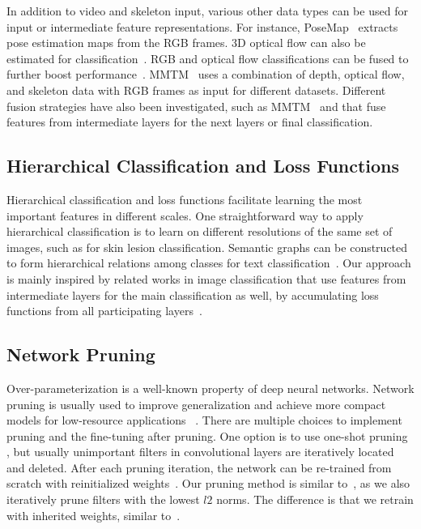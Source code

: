 \documentclass{article}
\begin{document}
{In addition to video and skeleton input, various other data types can be used for input or intermediate feature representations. For instance,  PoseMap~\cite{Liu2018Recognizing} extracts pose estimation maps from the RGB frames. 3D optical flow can also be estimated for classification~\cite{Ballin_3DFlowEstimation}. RGB and optical flow classifications can be fused to further boost performance~\cite{Simonyan_two-stream}. MMTM~\cite{joze2019mmtm} uses a combination of depth, optical flow, and skeleton data with RGB frames as input for different datasets. Different fusion strategies have also been investigated, such as MMTM~\cite{joze2019mmtm} and \cite{Perez_Rua_2019} that fuse features from intermediate layers for the next layers or final classification.}









\subsection{Hierarchical Classification and Loss Functions}
{Hierarchical classification and loss functions facilitate learning the most important features in different scales. One straightforward way to apply hierarchical classification is to learn on different resolutions of the same set of images, such as \cite{Kawahara2016MultiresolutionTractCW} for skin lesion classification. Semantic graphs can be constructed to form hierarchical relations among classes for text classification~\cite{Wu_2019}. Our approach is mainly inspired by related works in image classification that use features from intermediate layers for the main classification as well, by accumulating loss functions from all participating layers~\cite{Szegedy_2015_CVPR,huang2018multiscale}.}

\subsection{Network Pruning}
{Over-parameterization is a well-known property of deep neural networks. Network pruning is usually used to improve generalization and achieve more compact models for low-resource applications ~\cite{frankle2018lottery,liu2018rethinking}. There are multiple choices to implement pruning and the fine-tuning after pruning. One option is to use one-shot pruning \cite{li2016pruning}, but usually unimportant filters in convolutional layers are iteratively located and deleted. After each pruning iteration, the network can be re-trained from scratch with reinitialized weights~\cite{frankle2018lottery,liu2018rethinking}. Our pruning method is similar to~\cite{frankle2018lottery}, as we also iteratively prune filters with the lowest $l2$ norms. The difference is that we retrain with inherited weights, similar to~\cite{li2016pruning}.}
\end{document}
